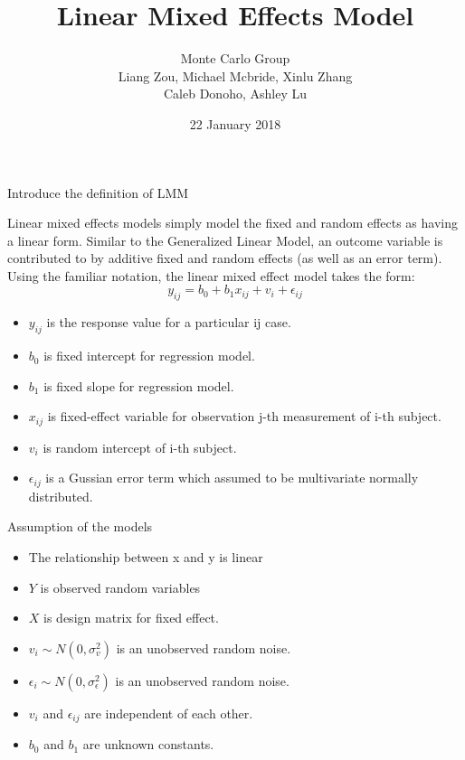 \documentclass[ignorenonframetext,]{beamer}
\title{Linear Mixed Effects Model}
\author{Monte Carlo Group\\[2\baselineskip]Liang Zou, Michael Mcbride, Xinlu
Zhang\\
Caleb Donoho, Ashley Lu\\}
\date{22 January 2018}
\providecommand{\tightlist}{%
  \setlength{\itemsep}{0pt}\setlength{\parskip}{0pt}}
\begin{document}
\frame{\titlepage}

\begin{frame}{Introduce the definition of LMM}

Linear mixed effects models simply model the fixed and random effects as
having a linear form. Similar to the Generalized Linear Model, an
outcome variable is contributed to by additive fixed and random effects
(as well as an error term). Using the familiar notation, the linear
mixed effect model takes the form:
\[y_{ij}=b_0+b_1x_{ij}+v_i+\epsilon_{ij}\]

\begin{itemize}
\tightlist
\item
  \(y_{ij}\) is the response value for a particular ij case.
\item
  \(b_0\) is fixed intercept for regression model.
\item
  \(b_1\) is fixed slope for regression model.
\item
  \(x_{ij}\) is fixed-effect variable for observation j-th measurement
  of i-th subject.
\item
  \(v_{i}\) is random intercept of i-th subject.
\item
  \(\epsilon_{ij}\) is a Gussian error term which assumed to be
  multivariate normally distributed.
\end{itemize}

\end{frame}

\begin{frame}{Assumption of the models}

\begin{itemize}
\tightlist
\item
  The relationship between x and y is linear
\item
  \(Y\) is observed random variables
\item
  \(X\) is design matrix for fixed effect.
\item
  \(v_i \sim N(0,\sigma^2_v)\) is an unobserved random noise.
\item
  \(\epsilon_i \sim N(0,\sigma^2_\epsilon)\) is an unobserved random
  noise.
\item
  \(v_i\) and \(\epsilon_{ij}\) are independent of each other.
\item
  \(b_0\) and \(b_1\) are unknown constants.
\end{itemize}

\end{frame}
\end{document}
